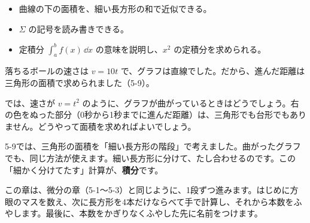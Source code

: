 
\begin{goal}
\begin{itemize}[label={\color{bkTheme}●}, leftmargin=1.6\zw, itemsep=0pt, topsep=1pt]
\item {}\enspace 曲線の下の面積を、細い長方形の和で近似できる。
\item {}\enspace $\Sigma$ の記号を読み書きできる。
\item {}\enspace 定積分 $\displaystyle\int_a^b f(x)\,\dd x$ の意味を説明し、$x^2$ の定積分を求められる。
\end{itemize}
\end{goal}

\begin{hatena}
\noindent\begin{minipage}[c]{0.56\linewidth}
落ちるボールの速さは $v=10t$ で、グラフは直線でした。だから、進んだ距離は三角形の面積で求められました（5-9）。

では、速さが $v=t^2$ のように、グラフが曲がっているときはどうでしょう。右の色をぬった部分（0秒から1秒までに進んだ距離）は、三角形でも台形でもありません。どうやって面積を求めればよいでしょう。
\end{minipage}\hfill
\begin{minipage}[c]{0.4\linewidth}
\end{minipage}
\end{hatena}

5-9では、三角形の面積を「細い長方形の階段」で考えました。曲がったグラフでも、同じ方法が使えます。細い長方形に分けて、たし合わせるのです。この「細かく分けてたす」計算が、\textbf{積分}です。

この章は、微分の章（5-1〜5-3）と同じように、1段ずつ進みます。はじめに方眼のマスを数え、次に長方形を4本だけならべて手で計算し、それから本数をふやします。最後に、本数をかぎりなくふやした先に名前をつけます。

